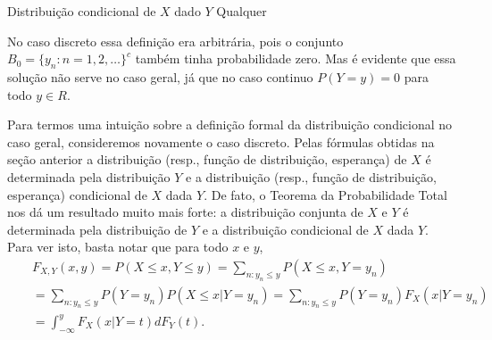 \begin{frame}
\begin{block}{Distribuição condicional de $X$ dado $Y$ Qualquer}

No caso discreto essa definição era arbitrária, pois o
conjunto $B_0=\{y_n:n=1,2,\ldots\}^c$ também tinha probabilidade
zero. Mas é evidente que essa solução não serve no caso geral, já
que no caso continuo $P(Y=y)=0$ para todo $y\in R$.

\end{block}

\begin{block}{}


Para termos uma intuição sobre a definição formal da distribuição condicional no caso geral,
consideremos novamente o caso discreto. Pelas fórmulas obtidas na
seção anterior a distribuição (resp., função de distribuição,
esperança) de $X$ é determinada pela distribuição $Y$ e a
distribuição (resp., função de distribuição, esperança) condicional
de $X$ dada $Y$. De fato, o Teorema da Probabilidade Total nos dá um
resultado muito mais forte: a distribuição conjunta de $X$ e $Y$ é
determinada pela distribuição de $Y$ e a distribuição condicional de
$X$ dada $Y$. Para ver isto, basta notar que para todo $x$ e $y$,
\begin{eqnarray}
& & F_{X,Y}(x,y)=P(X\leq x, Y\leq y)=\sum_{n:y_n\leq y}P(X\leq
x,Y=y_n) \nonumber \\
& & =\sum_{n:y_n\leq y}P(Y=y_n)P(X\leq x|Y=y_n) =\sum_{n:y_n\leq
y}P(Y=y_n)F_X(x|Y=y_n) \nonumber \\
& & =\int_{-\infty}^{y}F_X(x|Y=t)dF_Y(t). \nonumber
\end{eqnarray}


\end{block}
\end{frame}

